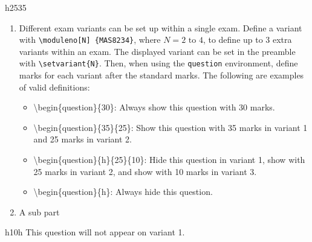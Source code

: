 \documentclass[12pt,a4paper]{article} %
\begin{document}
\begin{question}{h}{25}{35}
\begin{enumerate}
\item Different exam variants can be set up within a single exam. Define a variant with \texttt{\textbackslash moduleno[N] \{MAS8234\}}, where $N=2\text{ to }4$, to define up to 3 extra variants within an exam. The displayed variant can be set in the preamble with \texttt{\textbackslash setvariant\{N\}}. Then, when using the \texttt{question} environment, define marks for each variant after the standard marks. The following are examples of valid definitions:
\begin{itemize}
\item \textbackslash begin\{question\}\{30\}: Always show this question with 30 marks.
\item \textbackslash begin\{question\}\{35\}\{25\}: Show this question with 35 marks in variant 1 and 25 marks in variant 2.
\item \textbackslash begin\{question\}\{h\}\{25\}\{10\}: Hide this question in variant 1, show with 25 marks in variant 2, and show with 10 marks in variant 3.
\item \textbackslash begin\{question\}\{h\}: Always hide this question.
\end{itemize}
\item A sub part
\end{enumerate}
\end{question}


\begin{question}{h}{10}{h}
This question will not appear on variant 1.
\end{question}

\theend			%
\end{document}
